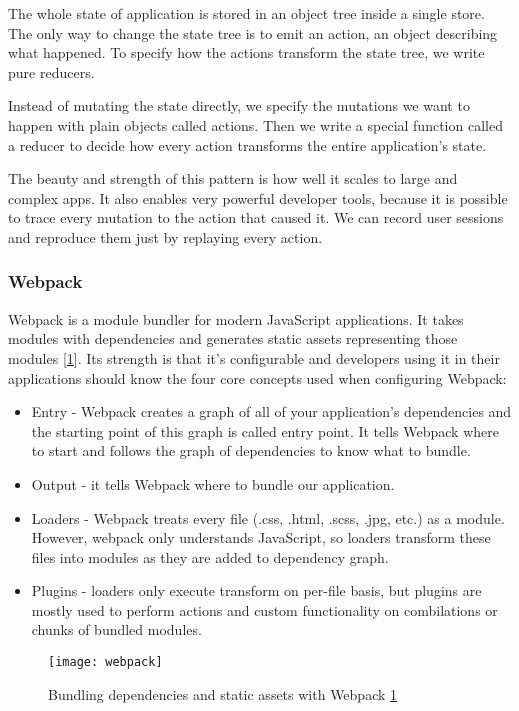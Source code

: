 The whole state of application is stored in an object tree inside a single store. The only way to change the state tree is to emit an action, an object describing what happened. To specify how the actions transform the state tree, we write pure reducers.

Instead of mutating the state directly, we specify the mutations we want to happen with plain objects called actions. Then we write a special function called a reducer to decide how every action transforms the entire application's state.

The beauty and strength of this pattern is how well it scales to large and complex apps. It also enables very powerful developer tools, because it is possible to trace every mutation to the action that caused it. We can record user sessions and reproduce them just by replaying every action.

\subsubsection{Webpack}
Webpack is a module bundler for modern JavaScript applications. It takes modules with dependencies and generates static assets representing those modules [\ref{r:1}]. Its strength is that it's configurable and developers using it in their applications should know the four core concepts used when configuring Webpack:

\begin{itemize}
\item Entry - Webpack creates a graph of all of your application's dependencies and the starting point of this graph is called entry point. It tells Webpack where to start and follows the graph of dependencies to know what to bundle.
\item Output - it tells Webpack where to bundle our application.
\item Loaders - Webpack treats every file (.css, .html, .scss, .jpg, etc.) as a module. However, webpack only understands JavaScript, so loaders transform these files into modules as they are added to dependency graph.
\item Plugins - loaders only execute transform on per-file basis, but plugins are mostly used to perform actions and custom functionality on combilations or chunks of bundled modules.
\end{itemize}

\begin{figure}[ht!]
\centering
\texttt{[image: webpack]}
\caption{Bundling dependencies and static assets with Webpack \ref{r:1}}
\label{r:1}
\end{figure}

